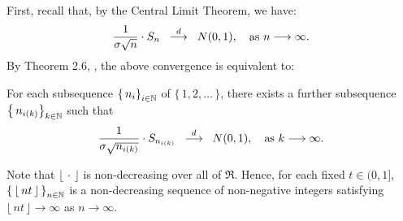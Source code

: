 \begin{enumerate}
		First, recall that, by the Central Limit Theorem, we have:
		\begin{equation*}
		\dfrac{1}{\sigma\sqrt{n}} \cdot S_{n}
		\;\; \overset{d}{\longrightarrow} \;\;
		N(0,1),
		\quad
		\textnormal{as $n \longrightarrow \infty$}.
		\end{equation*}
		By Theorem 2.6, \cite{Billingsley1999}, the above convergence is equivalent to:
		\begin{center}
		For each subsequence $\left\{\,n_{i}\right\}_{i\in\mathbb{N}}$ of $\{\,1,2,\ldots\,\}$, there exists a further subsequence
		$\left\{\,n_{i(k)}\right\}_{k\in\mathbb{N}}$ such that
		\begin{equation*}
		\dfrac{1}{\sigma\sqrt{n_{i(k)}}} \cdot S_{n_{i(k)}}
		\;\; \overset{d}{\longrightarrow} \;\;
		N(0,1),
		\quad
		\textnormal{as $k \longrightarrow \infty$}.
		\end{equation*}		
		\end{center}
		Note that $\lfloor\,\cdot\,\rfloor$ is non-decreasing over all of $\Re$.
		Hence, for each fixed $t \in (0,1]$, $\left\{\,\lfloor\,nt\,\rfloor\,\right\}_{n\in\mathbb{N}}$
		is a non-decreasing sequence of non-negative integers satisfying
		$\lfloor\,nt\,\rfloor \longrightarrow \infty$ as $n \longrightarrow \infty$.

\end{enumerate}


